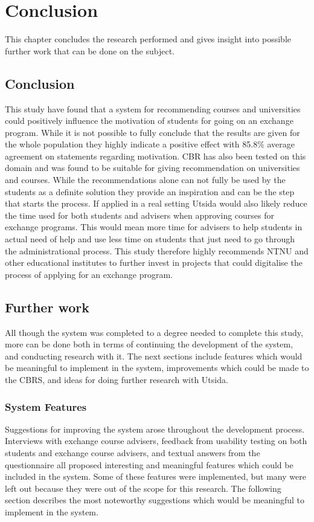 
\chapter{Conclusion}
This chapter concludes the research performed and gives insight into possible further work that can be done on the subject. 

\section{Conclusion}
This study have found that a system for recommending courses and universities could positively influence the motivation of students for going on an exchange program. While it is not possible to fully conclude that the results are given for the whole population they highly indicate a positive effect with 85.8\% average agreement on statements regarding motivation. CBR has also been tested on this domain and was found to be suitable for giving recommendation on universities and courses. While the recommendations alone can not fully be used by the students as a definite solution they provide an inspiration and can be the step that starts the process. If applied in a real setting Utsida would also likely reduce the time used for both students and advisers when approving courses for exchange programs. This would mean more time for advisers to help students in actual need of help and use less time on students that just need to go through the administrational process. This study therefore highly recommends NTNU and other educational institutes to further invest in projects that could digitalise the process of applying for an exchange program.



\section{Further work}
All though the system was completed to a degree needed to complete this study, more can be done both in terms of continuing the development of the system, and conducting research with it. The next sections include features which would be meaningful to implement in the system, improvements which could be made to the CBRS, and ideas for doing further research with Utsida.

\subsection{System Features}
Suggestions for improving the system arose throughout the development process. Interviews with exchange course advisers, feedback from usability testing on both students and exchange course advisers, and textual answers from the questionnaire all proposed interesting and meaningful features which could be included in the system. Some of these features were implemented, but many were left out because they were out of the scope for this research. The following section describes the most noteworthy suggestions which would be meaningful to implement in the system.

